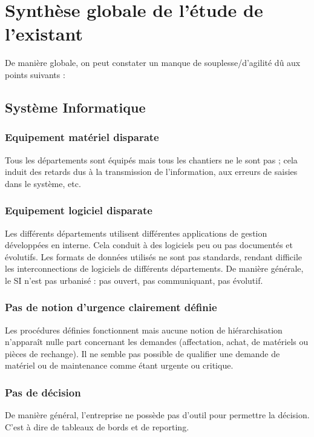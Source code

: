 \section{Synthèse globale de l'étude de l'existant}

De manière globale, on peut constater un manque de souplesse/d'agilité dû
aux points suivants :

\subsection{Système Informatique}

\subsubsection{Equipement matériel disparate}
Tous les départements sont équipés mais tous les chantiers ne le sont pas ;
cela induit des retards dus à la transmission de l'information, aux erreurs
de saisies dans le système, etc.  

\subsubsection{Equipement logiciel disparate}
Les différents départements utilisent différentes applications de gestion
développées en interne. Cela conduit à des logiciels peu ou pas documentés
et évolutifs. Les formats de données utilisés ne sont pas standards,
rendant difficile les interconnections de logiciels de différents
départements. De manière générale, le SI n'est pas urbanisé : pas ouvert,
pas communiquant, pas évolutif.

\subsubsection{Pas de notion d'urgence clairement définie}
Les procédures définies fonctionnent mais aucune notion de hiérarchisation
n'apparaît nulle part concernant les demandes (affectation, achat, de
matériels ou pièces de rechange).  Il ne semble pas possible de qualifier
une demande de matériel ou de maintenance comme étant urgente ou critique.

\subsubsection{Pas de décision}

De manière général, l'entreprise ne possède pas d'outil pour permettre la 
décision. C'est à dire de tableaux de bords et de reporting.

